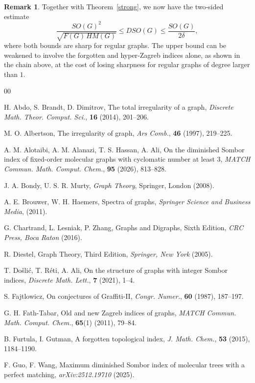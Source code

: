 \documentclass{article}
\theoremstyle{definition}
\newtheorem{remark}{Remark}
\begin{document}
\begin{remark}
Together with Theorem~\ref{strong}, we now have the two‑sided estimate
\[
\frac{SO(G)^2}{\sqrt{F(G)\,HM(G)}} \le DSO(G) \le \frac{SO(G)}{2\delta},
\]
where both bounds are sharp for regular graphs. The upper bound can be weakened to involve the forgotten and hyper‑Zagreb indices alone, as shown in the chain above, at the cost of losing sharpness for regular graphs of degree larger than $1$.
\end{remark}


\begin{thebibliography}{00}

H. Abdo, S. Brandt, D. Dimitrov, The total irregularity of a graph, \textit{Discrete Math. Theor. Comput. Sci.}, \textbf{16} (2014), 201–206.

M. O. Albertson, The irregularity of graph, \textit{Ars Comb.}, \textbf{46} (1997), 219–225.

A. M. Alotaibi, A. M. Alanazi, T. S. Hassan, A. Ali, On the diminished Sombor index of fixed-order molecular graphs with cyclomatic number at least 3, \textit{MATCH Commun. Math. Comput. Chem.}, \textbf{95} (2026), 813–828.

J. A. Bondy, U. S. R. Murty, \textit{Graph Theory}, Springer, London (2008).

A. E. Brouwer, W. H. Haemers, Spectra of graphs, \textit{Springer Science and Business Media}, (2011).

G. Chartrand, L. Lesniak, P. Zhang, Graphs and Digraphs, Sixth Edition, \textit{CRC Press, Boca Raton} (2016).

R. Diestel, Graph Theory, Third Edition, \textit{Springer, New York} (2005).

T. Došlić, T. Réti, A. Ali, On the structure of graphs with integer Sombor indices, \textit{Discrete Math. Lett.}, \textbf{7} (2021), 1–4.

S. Fajtlowicz, On conjectures of Graffiti-II, \textit{Congr. Numer.}, \textbf{60} (1987), 187–197.

G. H. Fath-Tabar, Old and new Zagreb indices of graphs, \textit{MATCH Commun. Math. Comput. Chem.}, \textbf{65}(1) (2011), 79–84.

B. Furtula, I. Gutman, A forgotten topological index, \textit{J. Math. Chem.}, \textbf{53} (2015), 1184–1190.

F. Guo, F. Wang, Maximum diminished Sombor index of molecular trees with a perfect matching, \textit{arXiv:2512.19710} (2025).


\end{thebibliography}
\end{document}
